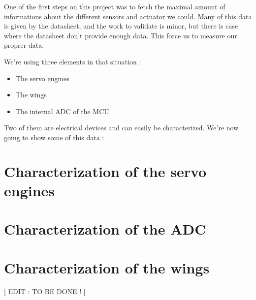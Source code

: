 One of the first steps on this project was to fetch the maximal amount of informations
about the different sensors and actuator we could.
Many of this data is given by the datasheet, and the work to validate is minor, but there
is case where the datasheet don't provide enough data.
This force us to measure our proprer data.

We're using three elements in that situation :
\begin{itemize}[noitemsep]
    \item The servo engines
    \item The wings
    \item The internal ADC of the MCU
\end{itemize}

Two of them are electrical devices and can easily be characterized.
We're now going to show some of this data :

\section{Characterization of the servo engines}


\section{Characterization of the ADC}


\section{Characterization of the wings}

[ EDIT :  TO BE DONE ! ]

